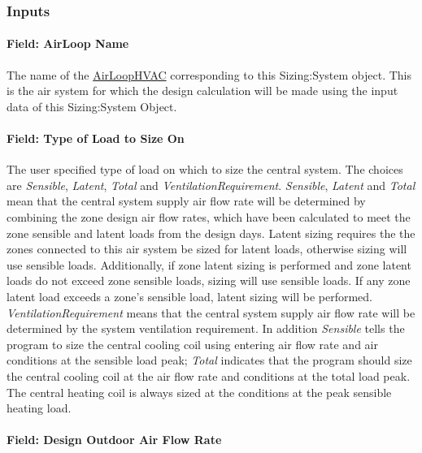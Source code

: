 \subsubsection{Inputs}\label{inputs-6-006}

\paragraph{Field: AirLoop Name}\label{field-airloop-name}

The name of the \hyperref[airloophvac]{AirLoopHVAC} corresponding to this Sizing:System object. This is the air system for which the design calculation will be made using the input data of this Sizing:System Object.

\paragraph{Field: Type of Load to Size On}\label{field-type-of-load-to-size-on}

The user specified type of load on which to size the central system. The choices are \emph{Sensible}, \emph{Latent}, \emph{Total} and \emph{VentilationRequirement}. \emph{Sensible}, \emph{Latent} and \emph{Total} mean that the central system supply air flow rate will be determined by combining the zone design air flow rates, which have been calculated to meet the zone sensible and latent loads from the design days. Latent sizing requires the the zones connected to this air system be sized for latent loads, otherwise sizing will use sensible loads. Additionally, if zone latent sizing is performed and zone latent loads do not exceed zone sensible loads, sizing will use sensible loads. If any zone latent load exceeds a zone's sensible load, latent sizing will be performed. \emph{VentilationRequirement} means that the central system supply air flow rate will be determined by the system ventilation requirement. In addition \emph{Sensible} tells the program to size the central cooling coil using entering air flow rate and air conditions at the sensible load peak; \emph{Total} indicates that the program should size the central cooling coil at the air flow rate and conditions at the total load peak. The central heating coil is always sized at the conditions at the peak sensible heating load.

\paragraph{Field: Design Outdoor Air Flow Rate}\label{field-design-outdoor-air-flow-rate}

